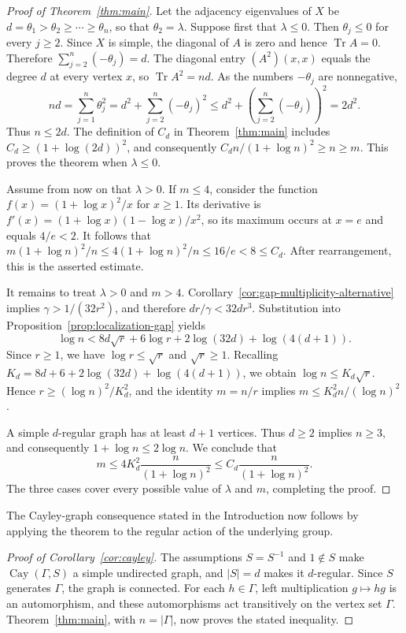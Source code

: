 \documentclass[11pt]{article}
\theoremstyle{definition}
\theoremstyle{remark}
\begin{document}
\begin{proof}[Proof of Theorem~\ref{thm:main}]
Let the adjacency eigenvalues of $X$ be $d=\theta_1>\theta_2\geq\cdots\geq\theta_n$, so that $\theta_2=\lambda$. Suppose first that $\lambda\leq0$. Then $\theta_j\leq0$ for every $j\geq2$. Since $X$ is simple, the diagonal of $A$ is zero and hence $\operatorname{Tr}A=0$. Therefore $\sum_{j=2}^n(-\theta_j)=d$. The diagonal entry $(A^2)(x,x)$ equals the degree $d$ at every vertex $x$, so $\operatorname{Tr}A^2=nd$. As the numbers $-\theta_j$ are nonnegative,
\[
nd=\sum_{j=1}^n\theta_j^2
=d^2+\sum_{j=2}^n(-\theta_j)^2\leq d^2+\left(\sum_{j=2}^n(-\theta_j)\right)^2
=2d^2.
\]
Thus $n\leq2d$. The definition of $C_d$ in Theorem~\ref{thm:main} includes $C_d\geq(1+\log(2d))^2$, and consequently $C_dn/(1+\log n)^2\geq n\geq m$. This proves the theorem when $\lambda\leq0$.

Assume from now on that $\lambda>0$. If $m\leq4$, consider the function $f(x)=(1+\log x)^2/x$ for $x\geq1$. Its derivative is $f'(x)=(1+\log x)(1-\log x)/x^2$, so its maximum occurs at $x=e$ and equals $4/e<2$. It follows that $m(1+\log n)^2/n\leq4(1+\log n)^2/n\leq16/e<8\leq C_d$. After rearrangement, this is the asserted estimate.

It remains to treat $\lambda>0$ and $m>4$. Corollary~\ref{cor:gap-multiplicity-alternative} implies $\gamma>1/(32r^2)$, and therefore $dr/\gamma<32dr^3$. Substitution into Proposition~\ref{prop:localization-gap} yields
\[
\log n<8d\sqrt r+6\log r+2\log(32d)+\log(4(d+1)).
\]
Since $r\geq1$, we have $\log r\leq\sqrt r$ and $\sqrt r\geq1$. Recalling $K_d=8d+6+2\log(32d)+\log(4(d+1))$, we obtain $\log n\leq K_d\sqrt r$. Hence $r\geq(\log n)^2/K_d^2$, and the identity $m=n/r$ implies $m\leq K_d^2n/(\log n)^2$.

A simple $d$-regular graph has at least $d+1$ vertices. Thus $d\geq2$ implies $n\geq3$, and consequently $1+\log n\leq2\log n$. We conclude that
\[
m\leq4K_d^2\frac{n}{(1+\log n)^2}\leq C_d\frac{n}{(1+\log n)^2}.
\]
The three cases cover every possible value of $\lambda$ and $m$, completing the proof.
\end{proof}

The Cayley-graph consequence stated in the Introduction now follows by applying the theorem to the regular action of the underlying group.

\begin{proof}[Proof of Corollary~\ref{cor:cayley}]
The assumptions $S=S^{-1}$ and $1\notin S$ make $\operatorname{Cay}(\Gamma,S)$ a simple undirected graph, and $|S|=d$ makes it $d$-regular. Since $S$ generates $\Gamma$, the graph is connected. For each $h\in\Gamma$, left multiplication $g\mapsto hg$ is an automorphism, and these automorphisms act transitively on the vertex set $\Gamma$. Theorem~\ref{thm:main}, with $n=|\Gamma|$, now proves the stated inequality.
\end{proof}
\end{document}
